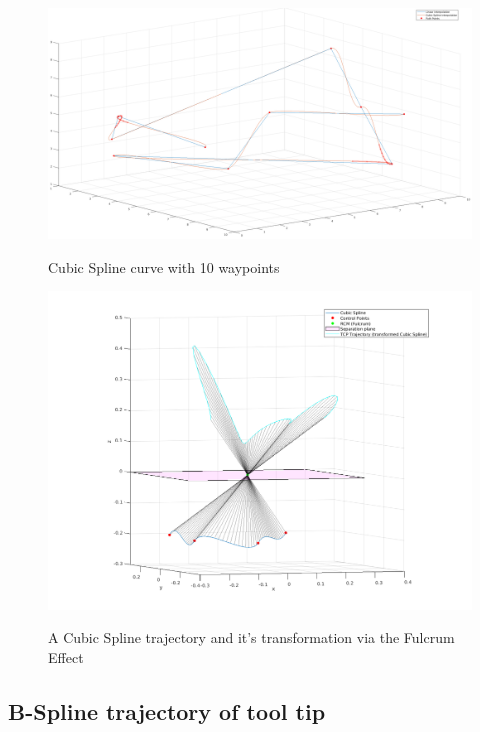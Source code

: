 \begin{center}
\begin{figure}[!htb]
\centering
\includegraphics[width=\textwidth]{images/cubic-spline-path1.png}\\
\caption{Cubic Spline curve with 10 waypoints} 
\label{cubic-spline-explanation}
\end{figure}
\end{center}

\begin{center}
\begin{figure}[!htb]
\centering
\includegraphics[width=\textwidth]{images/rcm_trajectories/rcm_cubic_traj.png}\\
\caption{A Cubic Spline trajectory and it's transformation via the Fulcrum Effect}
\end{figure}
\end{center}


\subsection{B-Spline trajectory of tool tip}

